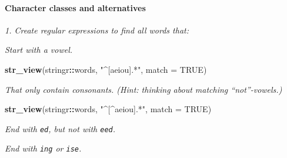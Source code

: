 \documentclass[]{article}
\newenvironment{Shaded}{\begin{snugshade}}{\end{snugshade}}
\newcommand{\KeywordTok}[1]{\textcolor[rgb]{0.13,0.29,0.53}{\textbf{#1}}}
\newcommand{\DataTypeTok}[1]{\textcolor[rgb]{0.13,0.29,0.53}{#1}}
\newcommand{\StringTok}[1]{\textcolor[rgb]{0.31,0.60,0.02}{#1}}
\newcommand{\OtherTok}[1]{\textcolor[rgb]{0.56,0.35,0.01}{#1}}
\newcommand{\OperatorTok}[1]{\textcolor[rgb]{0.81,0.36,0.00}{\textbf{#1}}}
\newcommand{\NormalTok}[1]{#1}
\let\oldparagraph\paragraph
\renewcommand{\paragraph}[1]{\oldparagraph{#1}\mbox{}}
\theoremstyle{definition}
\theoremstyle{definition}
\theoremstyle{definition}
\theoremstyle{remark}
\begin{document}
\hypertarget{htmlwidget-1dda188cf12e9f3e009e}{}

\paragraph{Character classes and
alternatives}\label{character-classes-and-alternatives}

\emph{1. Create regular expressions to find all words that:}

\emph{Start with a vowel.}

\begin{Shaded}
\begin{Highlighting}[]
\KeywordTok{str_view}\NormalTok{(stringr}\OperatorTok{::}\NormalTok{words, }\StringTok{"^[aeiou].*"}\NormalTok{, }\DataTypeTok{match =} \OtherTok{TRUE}\NormalTok{)}
\end{Highlighting}
\end{Shaded}

\hypertarget{htmlwidget-30e6fcd0f68773676b0f}{}

\emph{That only contain consonants. (Hint: thinking about matching
``not''-vowels.)}

\begin{Shaded}
\begin{Highlighting}[]
\KeywordTok{str_view}\NormalTok{(stringr}\OperatorTok{::}\NormalTok{words, }\StringTok{"^[^aeiou].*"}\NormalTok{, }\DataTypeTok{match =} \OtherTok{TRUE}\NormalTok{)}
\end{Highlighting}
\end{Shaded}

\hypertarget{htmlwidget-76542ec0127b33dc8017}{}

\emph{End with \texttt{ed}, but not with \texttt{eed}.}

\begin{Shaded}
\end{Shaded}

\hypertarget{htmlwidget-44a6b0c323c3639d1c91}{}

\emph{End with \texttt{ing} or \texttt{ise}.}

\begin{Shaded}
\end{Shaded}
\end{document}
